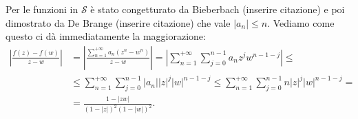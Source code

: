 Per le funzioni in $\mathcal{S}$ è stato congetturato da Bieberbach (inserire citazione) e poi dimostrato da De Brange (inserire citazione) che vale $|a_n| \le n$. Vediamo come questo ci dà immediatamente la maggiorazione:
\begin{align*}
  \left|\frac{f(z)-f(w)}{z-w}\right|&=\left|\frac{\sum_{n=1}^{+\infty}a_n(z^n-w^n)}{z-w}\right|=\left|\sum_{n=1}^{+\infty}\sum_{j=0}^{n-1}a_nz^jw^{n-1-j}\right| \le \\
  &\le \sum_{n=1}^{+\infty}\sum_{j=0}^{n-1}|a_n||z|^j|w|^{n-1-j} \le \sum_{n=1}^{+\infty}\sum_{j=0}^{n-1}n|z|^j|w|^{n-1-j}= \\
  &=\frac{1-|zw|}{(1-|z|)^2(1-|w|)^2}.
\end{align*}
